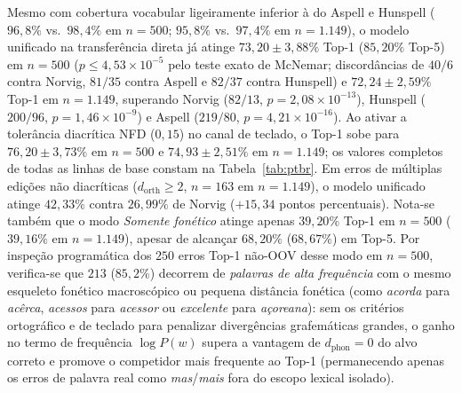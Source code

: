 \documentclass[a4paper, twocolumn, 11pt, twoside]{article}
\begin{document}
Mesmo com cobertura vocabular ligeiramente inferior à do Aspell e Hunspell ($96{,}8\%$ vs.\ $98{,}4\%$ em $n=500$; $95{,}8\%$ vs.\ $97{,}4\%$ em $n=1.149$), o modelo unificado na transferência direta já atinge $73{,}20\pm3{,}88\%$ Top-1 ($85{,}20\%$ Top-5) em $n=500$ ($p \le 4{,}53\times 10^{-5}$ pelo teste exato de McNemar; discordâncias de $40/6$ contra Norvig, $81/35$ contra Aspell e $82/37$ contra Hunspell) e $72{,}24\pm2{,}59\%$ Top-1 em $n=1.149$, superando Norvig ($82/13$, $p=2{,}08\times 10^{-13}$), Hunspell ($200/96$, $p=1{,}46\times 10^{-9}$) e Aspell ($219/80$, $p=4{,}21\times 10^{-16}$). Ao ativar a tolerância diacrítica NFD ($0{,}15$) no canal de teclado, o Top-1 sobe para $76{,}20\pm3{,}73\%$ em $n=500$ e $74{,}93\pm2{,}51\%$ em $n=1.149$; os valores completos de todas as linhas de base constam na Tabela~\ref{tab:ptbr}. Em erros de múltiplas edições não diacríticas ($d_{\text{orth}}\ge 2$, $n=163$ em $n=1.149$), o modelo unificado atinge $42{,}33\%$ contra $26{,}99\%$ de Norvig ($+15{,}34$ pontos percentuais). Nota-se também que o modo \textit{Somente fonético} atinge apenas $39{,}20\%$ Top-1 em $n=500$ ($39{,}16\%$ em $n=1.149$), apesar de alcançar $68{,}20\%$ ($68{,}67\%$) em Top-5. Por inspeção programática dos $250$ erros Top-1 não-OOV desse modo em $n=500$, verifica-se que $213$ ($85{,}2\%$) decorrem de \emph{palavras de alta frequência} com o mesmo esqueleto fonético macroscópico ou pequena distância fonética (como \textit{acorda} para \textit{acêrca}, \textit{acessos} para \textit{acessor} ou \textit{excelente} para \textit{açoreana}): sem os critérios ortográfico e de teclado para penalizar divergências grafemáticas grandes, o ganho no termo de frequência $\log P(w)$ supera a vantagem de $d_{\text{phon}}=0$ do alvo correto e promove o competidor mais frequente ao Top-1 (permanecendo apenas os erros de palavra real como \textit{mas}/\textit{mais} fora do escopo lexical isolado).
\end{document}
